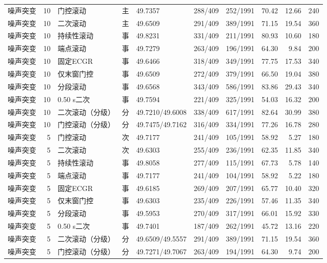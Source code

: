\documentclass[UTF8,a4paper,11pt]{ctexart}
\begin{document}
\begin{longtable}{lrlclrrrrr}
噪声突变 & 10 & 门控滚动 & 主 & 49.7357 & 288/409 & 252/1991 & 70.42 & 12.66 & 240 \\
噪声突变 & 10 & 二次滚动 & 主 & 49.6509 & 291/409 & 389/1991 & 71.15 & 19.54 & 360 \\
噪声突变 & 10 & 持续性滚动 & 事 & 49.8231 & 331/409 & 211/1991 & 80.93 & 10.60 & 180 \\
噪声突变 & 10 & 端点滚动 & 事 & 49.7279 & 263/409 & 196/1991 & 64.30 & 9.84 & 200 \\
噪声突变 & 10 & 固定ECGR & 事 & 49.6466 & 318/409 & 349/1991 & 77.75 & 17.53 & 340 \\
噪声突变 & 10 & 仅末窗门控 & 事 & 49.6509 & 272/409 & 379/1991 & 66.50 & 19.04 & 380 \\
噪声突变 & 10 & 分段滚动 & 事 & 49.6568 & 343/409 & 586/1991 & 83.86 & 29.43 & 340 \\
噪声突变 & 10 & 0.50 s二次 & 事 & 49.7594 & 221/409 & 325/1991 & 54.03 & 16.32 & 200 \\
噪声突变 & 10 & 二次滚动（分级） & 分 & 49.7210/49.6008 & 338/409 & 617/1991 & 82.64 & 30.99 & 380 \\
噪声突变 & 10 & 门控滚动（分级） & 分 & 49.7475/49.7162 & 316/409 & 334/1991 & 77.26 & 16.78 & 280 \\
噪声突变 & 5 & 门控滚动 & 次 & 49.7177 & 241/409 & 105/1991 & 58.92 & 5.27 & 180 \\
噪声突变 & 5 & 二次滚动 & 次 & 49.6303 & 255/409 & 236/1991 & 62.35 & 11.85 & 340 \\
噪声突变 & 5 & 持续性滚动 & 事 & 49.8058 & 277/409 & 115/1991 & 67.73 & 5.78 & 140 \\
噪声突变 & 5 & 端点滚动 & 事 & 49.7177 & 241/409 & 104/1991 & 58.92 & 5.22 & 180 \\
噪声突变 & 5 & 固定ECGR & 事 & 49.6185 & 269/409 & 207/1991 & 65.77 & 10.40 & 320 \\
噪声突变 & 5 & 仅末窗门控 & 事 & 49.6303 & 235/409 & 226/1991 & 57.46 & 11.35 & 340 \\
噪声突变 & 5 & 分段滚动 & 事 & 49.5953 & 270/409 & 317/1991 & 66.01 & 15.92 & 330 \\
噪声突变 & 5 & 0.50 s二次 & 事 & 49.7401 & 187/409 & 262/1991 & 45.72 & 13.16 & 220 \\
噪声突变 & 5 & 二次滚动（分级） & 分 & 49.6509/49.5557 & 291/409 & 389/1991 & 71.15 & 19.54 & 360 \\
噪声突变 & 5 & 门控滚动（分级） & 分 & 49.7271/49.7067 & 263/409 & 194/1991 & 64.30 & 9.74 & 200 \\
\end{longtable}\endgroup
\end{document}
